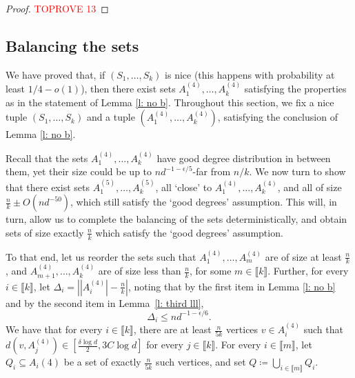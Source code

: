 \documentclass[notitlepage]{scrartcl}
\newcommand{\br}[1]{\llbracket{#1}\rrbracket}
\begin{document}
\begin{proof}\textcolor{red}{TOPROVE 13}\end{proof}

\subsection{Balancing the sets}\label{s: equal size} 

We have proved that, if $(S_1,\ldots,S_k)$ is nice (this happens with probability at least $1/4-o(1)$), then there exist sets $A_1^{(4)},\ldots, A_k^{(4)}$ satisfying the properties as in the statement of Lemma \ref{l: no b}.
Throughout this section, we fix a nice tuple $(S_1,\ldots,S_k)$ and a tuple $(A_1^{(4)},\ldots,A_k^{(4)})$, satisfying the conclusion of Lemma \ref{l: no b}.


Recall that the sets $A_1^{(4)},\ldots, A_k^{(4)}$ have good degree distribution in between them, yet their size could be up to $nd^{-1-\epsilon/5}$-far from $n/k$. We now turn to show that there exist sets $A_1^{(5)},\ldots, A_k^{(5)}$, all `close' to $A_1^{(4)},\ldots, A_k^{(4)}$, and all of size $\frac{n}{k}\pm O(nd^{-50})$, which still satisfy the `good degrees' assumption. This will, in turn, allow us to complete the balancing of the sets deterministically, and obtain sets of size exactly $\frac{n}{k}$ which satisfy the `good degrees' assumption. 

To that end, let us reorder the sets such that $A_1^{(4)},\ldots, A_m^{(4)}$ are of size at least $\frac{n}{k}$, and $A_{m+1}^{(4)},\ldots,A_k^{(4)}$ are of size less than $\frac{n}{k}$, for some $m\in \br{k}$. Further, for every $i\in \br{k}$, let $\Delta_i=\left||A_i^{(4)}|-\frac{n}{k}\right|$, noting that by the first item in Lemma \ref{l: no b} and by the second item in Lemma~\ref{l: third lll}, 
\begin{equation}
\Delta_i\le nd^{-1-\epsilon/6}.
\label{eq:Delta_i_upper_bound}
\end{equation} 
We have that for every $i\in \br{k}$, there are at least $\frac{n}{5k}$ vertices $v\in A_i^{(4)}$ such that $d(v,A_j^{(4)})\in \left[\frac{\delta\log d}{2}, 3C\log d\right]$ for every $j\in \br{k}$. For every $i\in \br{m}$, let $Q_i\subseteq A_i(4)$ be a set of exactly $\frac{n}{5k}$ such vertices, and set $Q\coloneqq\bigcup_{i\in \br{m}}Q_i$. 
\end{document}
